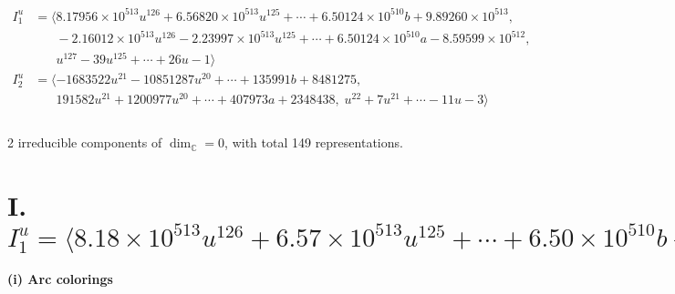 \documentclass[1p]{elsarticle_modified}
\theoremstyle{definition}
\begin{document}
\begin{align*}
I^u_{1}&=\langle 
8.17956\times10^{513} u^{126}+6.56820\times10^{513} u^{125}+\cdots+6.50124\times10^{510} b+9.89260\times10^{513},\\
\phantom{I^u_{1}}&\phantom{= \langle  }-2.16012\times10^{513} u^{126}-2.23997\times10^{513} u^{125}+\cdots+6.50124\times10^{510} a-8.59599\times10^{512},\\
\phantom{I^u_{1}}&\phantom{= \langle  }u^{127}-39 u^{125}+\cdots+26 u-1\rangle \\
I^u_{2}&=\langle 
-1683522 u^{21}-10851287 u^{20}+\cdots+135991 b+8481275,\\
\phantom{I^u_{2}}&\phantom{= \langle  }191582 u^{21}+1200977 u^{20}+\cdots+407973 a+2348438,\;u^{22}+7 u^{21}+\cdots-11 u-3\rangle \\
\\
\end{align*}
\raggedright * 2 irreducible components of $\dim_{\mathbb{C}}=0$, with total 149 representations.\\
\newpage
\renewcommand{\arraystretch}{1}
\centering \section*{I. $I^u_{1}= \langle 8.18\times10^{513} u^{126}+6.57\times10^{513} u^{125}+\cdots+6.50\times10^{510} b+9.89\times10^{513},\;-2.16\times10^{513} u^{126}-2.24\times10^{513} u^{125}+\cdots+6.50\times10^{510} a-8.60\times10^{512},\;u^{127}-39 u^{125}+\cdots+26 u-1 \rangle$}
\flushleft \textbf{(i) Arc colorings}\\
\end{document}
